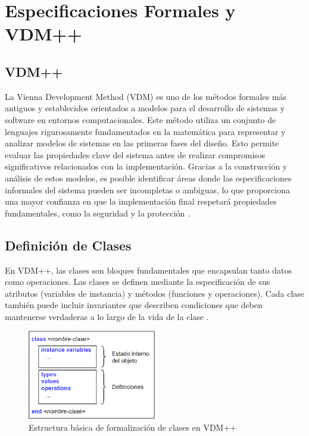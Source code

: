 \section{Especificaciones Formales y VDM++}
\subsection{VDM++}
La Vienna Development Method (VDM) es uno de los métodos formales más antiguos y establecidos orientados a modelos para el desarrollo de sistemas y software en entornos computacionales. Este método utiliza un conjunto de lenguajes rigurosamente fundamentados en la matemática para representar y analizar modelos de sistemas en las primeras fases del diseño. Esto permite evaluar las propiedades clave del sistema antes de realizar compromisos significativos relacionados con la implementación. Gracias a la construcción y análisis de estos modelos, es posible identificar áreas donde las especificaciones informales del sistema pueden ser incompletas o ambiguas, lo que proporciona una mayor confianza en que la implementación final respetará propiedades fundamentales, como la seguridad y la protección \cite{smith2021}.

\subsection{Definición de Clases}
En VDM++, las clases son bloques fundamentales que encapsulan tanto datos como operaciones. Las clases se definen mediante la especificación de sus atributos (variables de instancia) y métodos (funciones y operaciones). Cada clase también puede incluir invariantes que describen condiciones que deben mantenerse verdaderas a lo largo de la vida de la clase \cite{fitzgerald2009}.

\begin{figure}[h]
    \centering
    \includegraphics[width=0.5\textwidth]{Recursos/estructura_clases_vdm.png}
    \caption{Estructura básica de formalización de clases en VDM++}
\end{figure}

